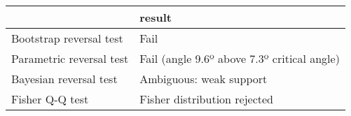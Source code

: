 \begin{tabular}{ll}
\toprule
{} &                                       result \\
\midrule
Bootstrap reversal test  &                                         Fail \\
Parametric reversal test &  Fail (angle 9.6º above 7.3º critical angle) \\
Bayesian reversal test   &                      Ambiguous: weak support \\
Fisher Q-Q test          &                 Fisher distribution rejected \\
\bottomrule
\end{tabular}
